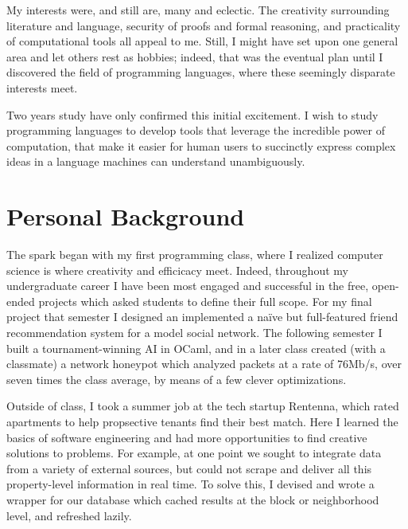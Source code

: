 \documentclass{article}
\begin{document}
My interests were, and still are, many and eclectic.
The creativity surrounding literature and language, security of proofs and formal reasoning, and practicality of computational tools all appeal to me. 
Still, I might have set upon one general area and let others rest as hobbies; indeed, that was the eventual plan until I discovered the field of programming languages, where these seemingly disparate interests meet.

Two years study have only confirmed this initial excitement.
I wish to study programming languages to develop tools that leverage the incredible power of computation, that make it easier for human users to succinctly express complex ideas in a language machines can understand unambiguously.

\section{Personal Background}

The spark began with my first programming class, where I realized computer science is where creativity and efficicacy meet. 
Indeed, throughout my undergraduate career I have been most engaged and successful in the free, open-ended projects which asked students to define their full scope.
For my final project that semester I designed an implemented a na\"ive but full-featured friend recommendation system for a model social network.
The following semester I built a tournament-winning AI in OCaml, and in a later class created (with a classmate) a network honeypot which analyzed packets at a rate of 76Mb/s, over seven times the class average, by means of a few clever optimizations.

Outside of class, I took a summer job at the tech startup Rentenna, which rated apartments to help propsective tenants find their best match.
Here I learned the basics of software engineering and had more opportunities to find creative solutions to problems.
For example, at one point we sought to integrate data from a variety of external sources, but could not scrape and deliver all this property-level information in real time.
To solve this, I devised and wrote a wrapper for our database which cached results at the block or neighborhood level, and refreshed lazily.
\end{document}
